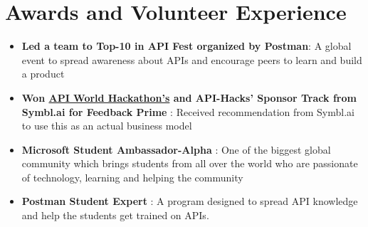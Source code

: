 \documentclass[letterpaper,11pt]{article}
\newcommand{\resumeItem}[1]{
  \item\small{
    {#1 \vspace{-2pt}}
  }
}
\newcommand{\resumeItemListStart}{\begin{itemize}}
\newcommand{\resumeItemListEnd}{\end{itemize}\vspace{-5pt}}
\begin{document}
\vspace{0.1mm}\section{\textbf{Awards and Volunteer Experience}}
 \begin{itemize}[leftmargin=0.15in, label={}]
    \small{\item{
        \resumeItemListStart
                \resumeItem{\textbf{Led a team to {Top-10 in API Fest} organized by Postman}: A global event to spread awareness about APIs and encourage peers to learn and build a product}
                \resumeItem{\textbf{{Won \href{https://devpost.com/software/feedback-prime-kbg8um}{API World Hackathon's} and {API-Hacks'} Sponsor Track from Symbl.ai for Feedback Prime} }: Received recommendation from Symbl.ai to use this as an actual business model}
                \resumeItem{\textbf{{Microsoft Student Ambassador-Alpha}} : One of the biggest global community which brings students from all over the world who are passionate of technology, learning and helping the community }
                \resumeItem{\textbf{{ Postman Student Expert}} : A program designed to spread API knowledge and help the students get trained on APIs.}
      \resumeItemListEnd
    }}
 \end{itemize}

 
 
\end{document}
